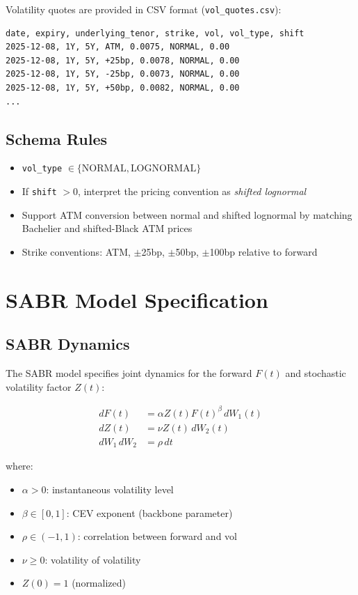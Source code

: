 \documentclass[12pt,a4paper]{report}
\newcommand{\code}[1]{\texttt{#1}}
\begin{document}
Volatility quotes are provided in CSV format (\code{vol\_quotes.csv}):

\begin{verbatim}
date, expiry, underlying_tenor, strike, vol, vol_type, shift
2025-12-08, 1Y, 5Y, ATM, 0.0075, NORMAL, 0.00
2025-12-08, 1Y, 5Y, +25bp, 0.0078, NORMAL, 0.00
2025-12-08, 1Y, 5Y, -25bp, 0.0073, NORMAL, 0.00
2025-12-08, 1Y, 5Y, +50bp, 0.0082, NORMAL, 0.00
...
\end{verbatim}

\subsection{Schema Rules}

\begin{itemize}[leftmargin=1.2em,itemsep=0.1em]
    \item \code{vol\_type} $\in\{\text{NORMAL},\text{LOGNORMAL}\}$
    \item If \code{shift} $> 0$, interpret the pricing convention as \emph{shifted lognormal}
    \item Support ATM conversion between normal and shifted lognormal by matching Bachelier and shifted-Black ATM prices
    \item Strike conventions: ATM, $\pm$25bp, $\pm$50bp, $\pm$100bp relative to forward
\end{itemize}

\section{SABR Model Specification}

\subsection{SABR Dynamics}

The SABR model specifies joint dynamics for the forward $F(t)$ and stochastic volatility factor $Z(t)$:

\begin{align}
    dF(t) &= \alpha Z(t) F(t)^\beta \, dW_1(t) \\
    dZ(t) &= \nu Z(t) \, dW_2(t) \\
    dW_1 \, dW_2 &= \rho \, dt
\end{align}

where:
\begin{itemize}[leftmargin=1.2em,itemsep=0.1em]
    \item $\alpha > 0$: instantaneous volatility level
    \item $\beta \in [0,1]$: CEV exponent (backbone parameter)
    \item $\rho \in (-1,1)$: correlation between forward and vol
    \item $\nu \geq 0$: volatility of volatility
    \item $Z(0) = 1$ (normalized)
\end{itemize}
\end{document}
